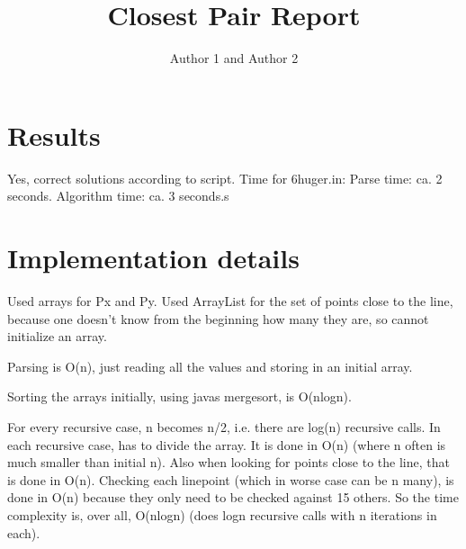 \documentclass{article}
\title{Closest Pair Report}
\author{Author 1 and Author 2}
\begin{document}
  \maketitle

  \section{Results}

  
  Yes, correct solutions according to script.
  Time for 6huger.in:
      Parse time: ca. 2 seconds.
      Algorithm time: ca. 3 seconds.s
  

  \section{Implementation details}

  
  Used arrays for Px and Py. Used ArrayList for the set of points close to the line, because one doesn't know from the beginning how many they are,
  so cannot initialize an array.
  
  Parsing is O(n), just reading all the values and storing in an initial array.
  
  Sorting the arrays initially, using javas mergesort, is O(nlogn).
  
  For every recursive case, n becomes n/2, i.e. there are log(n) recursive calls.
  In each recursive case, has to divide the array. It is done in O(n) (where n often is much smaller than initial n).
  Also when looking for points close to the line, that is done in O(n).
  Checking each linepoint (which in worse case can be n many), is done in O(n) because they only need to be checked against 15 others.
  So the time complexity is, over all, O(nlogn) (does logn recursive calls with n iterations in each).
\end{document}
